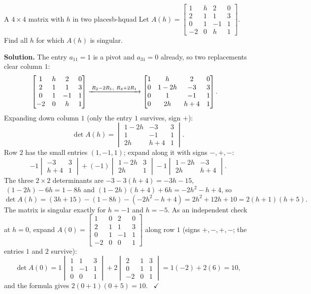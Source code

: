 \documentclass[11pt]{article}
\begin{document}
\begin{exmp}{A $4\times4$ matrix with $h$ in two places}{b-hquad}
Let $A(h)=\begin{bmatrix}1&h&2&0\\2&1&1&3\\0&1&-1&1\\-2&0&h&1\end{bmatrix}$. Find all $h$ for which $A(h)$ is singular.

\textbf{Solution.} The entry $a_{11}=1$ is a pivot and $a_{31}=0$ already, so two replacements clear column $1$:
\begin{align*}
\begin{bmatrix}1&h&2&0\\2&1&1&3\\0&1&-1&1\\-2&0&h&1\end{bmatrix}
&\xrightarrow{\;R_2-2R_1,\ R_4+2R_1\;}
\begin{bmatrix}1&h&2&0\\0&1-2h&-3&3\\0&1&-1&1\\0&2h&h+4&1\end{bmatrix}
.
\end{align*}
Expanding down column $1$ (only the entry $1$ survives, sign $+$):
\[
\det A(h)=\begin{vmatrix}1-2h&-3&3\\1&-1&1\\2h&h+4&1\end{vmatrix}.
\]
Row $2$ has the small entries $(1,-1,1)$; expand along it with signs $-,+,-$:
\[
-1\begin{vmatrix}-3&3\\h+4&1\end{vmatrix}+(-1)\begin{vmatrix}1-2h&3\\2h&1\end{vmatrix}-1\begin{vmatrix}1-2h&-3\\2h&h+4\end{vmatrix}.
\]
The three $2\times2$ determinants are $-3-3(h+4)=-3h-15$, $\ (1-2h)-6h=1-8h$ and $(1-2h)(h+4)+6h=-2h^2-h+4$, so
\[
\det A(h)=(3h+15)-(1-8h)-(-2h^2-h+4)=2h^2+12h+10=2(h+1)(h+5).
\]
The matrix is singular exactly for $h=-1$ and $h=-5$. As an independent check at $h=0$, expand $A(0)=\begin{bmatrix}1&0&2&0\\2&1&1&3\\0&1&-1&1\\-2&0&0&1\end{bmatrix}$ along row $1$ (signs $+,-,+,-$; the entries $1$ and $2$ survive):
\[
\det A(0)=1\begin{vmatrix}1&1&3\\1&-1&1\\0&0&1\end{vmatrix}+2\begin{vmatrix}2&1&3\\0&1&1\\-2&0&1\end{vmatrix}=1(-2)+2(6)=10,
\]
and the formula gives $2(0+1)(0+5)=10$. \ $\checkmark$
\end{exmp}
\end{document}
